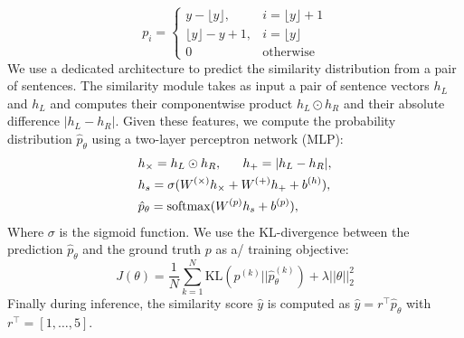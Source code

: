 \begin{equation*}
p_{i} = \left\{
\begin{array}{ll}
y - \lfloor{y}\rfloor, & i = \lfloor{y}\rfloor + 1 \\
\lfloor{y}\rfloor - y + 1, & i = \lfloor{y}\rfloor \\
0 & \text{otherwise}
\end{array} \right.
\end{equation*}
We use a dedicated architecture to predict the similarity distribution from a pair of sentences. The similarity module takes as input a pair of sentence vectors $h_{L} $ and $h_{L}$ and computes their component\-wise product $h_{L} \odot h_{R}$ and their absolute difference $|h_{L} - h_{R}|$. Given these features, we compute the probability distribution  $\hat{p}_{\theta}$ using a two-layer perceptron network (MLP):
\begin{align}
\begin{split}
&h_{\times}=h_L\odot h_R, ~~~~~h_{+} = |h_L - h_R |, \\
&h_s = \sigma (W^{(\times)}h_{\times} + W^{(+)}h_{+} + b^{(h)}), \\
&\hat{p}_{\theta} = \operatorname{softmax}(W^{(p)}h_s + b^{(p)}),\\
\end{split}
\end{align}
Where $\sigma$ is the sigmoid function. We use the KL-divergence between the prediction $\hat{p}_{\theta}$ and the ground truth $p$ as a/ training objective:
\begin{equation}
J(\theta) = \frac{1}{N}\sum_{k=1}^{N}\text{KL}(p^{(k)} || \hat{p}_{\theta}^{(k)}) + \lambda||\theta||_{2}^{2}
\end{equation}
Finally during inference, the similarity score $\hat{y}$ is computed as $\hat{y} = r^{\intercal} \hat{p}_{\theta}$ with $r^{\intercal} = [1, \dots, 5]$. 


